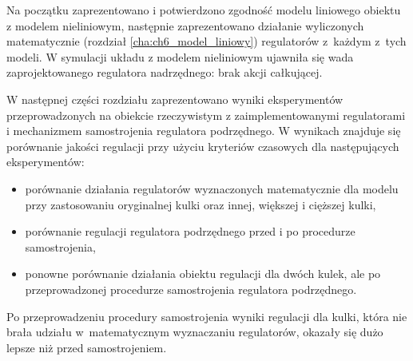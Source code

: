 Na początku zaprezentowano i potwierdzono zgodność modelu liniowego obiektu z modelem nieliniowym, następnie zaprezentowano działanie wyliczonych matematycznie (rozdział \ref{cha:ch6_model_liniowy}) regulatorów z~każdym z~tych modeli. W symulacji układu z modelem nieliniowym ujawniła się wada zaprojektowanego regulatora nadrzędnego: brak akcji całkującej.

W następnej części rozdziału zaprezentowano wyniki eksperymentów przeprowadzonych na obiekcie rzeczywistym z zaimplementowanymi regulatorami i mechanizmem samostrojenia regulatora podrzędnego. W wynikach znajduje się porównanie jakości regulacji przy użyciu kryteriów czasowych dla następujących eksperymentów:
\begin{itemize}
    \item porównanie działania regulatorów wyznaczonych matematycznie dla modelu przy zastosowaniu oryginalnej kulki oraz innej, większej i cięższej kulki,
    \item porównanie regulacji regulatora podrzędnego przed i po procedurze samostrojenia,
    \item ponowne porównanie działania obiektu regulacji dla dwóch kulek, ale po przeprowadzonej procedurze samostrojenia regulatora podrzędnego.
\end{itemize}

Po przeprowadzeniu procedury samostrojenia wyniki regulacji dla kulki, która nie brała udziału w~matematycznym wyznaczaniu regulatorów, okazały się dużo lepsze niż przed samostrojeniem.



